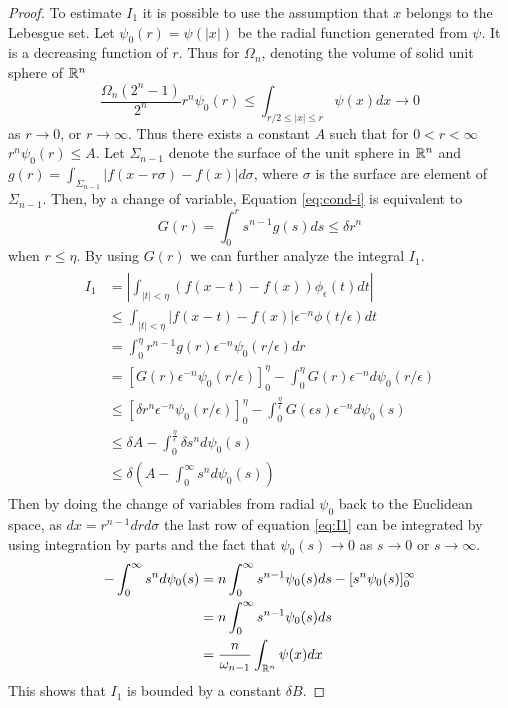 \begin{proof}
    To estimate $I_1$ it is possible to use the assumption that $x$ belongs to the Lebesgue set. Let $\psi_0(r)=\psi(|x|)$ be the radial function generated from $\psi$. It is a decreasing function of $r$. Thus for $\Omega_n$, denoting the volume of solid unit sphere of $\mathbb R^n$
    \begin{equation*}
        \frac{\Omega_n(2^n-1)}{2^n}r^n\psi_0(r)\leq\int_{r/2\leq|x|\leq r} \psi(x)dx\rightarrow0
    \end{equation*}
    as $r\rightarrow 0$, or $r\rightarrow\infty$. Thus there exists a constant $A$ such that for $0<r<\infty$ $r^n\psi_0(r)\leq A$. Let $\Sigma_{n-1}$ denote the surface of the unit sphere in $\mathbb R^n$ and $g(r)=\int_{\Sigma_{n-1}}|f(x-r\sigma)-f(x)|d\sigma$, where $\sigma$ is the surface are element of $\Sigma_{n-1}$. Then, by a change of variable, Equation \ref{eq:cond-i} is equivalent to
    \begin{equation*}
        G(r)=\int_0^rs^{n-1}g(s)ds\leq\delta r^n
    \end{equation*}
    when $r\leq\eta$. By using $G(r)$ we can further analyze the integral $I_1$.
    \begin{align}\label{eq:I1}
        \begin{split}
            I_1&=\left|\int_{|t|<\eta}(f(x-t)-f(x))\phi_\epsilon(t)dt \right| \\
            &\leq\int_{|t|<\eta}|f(x-t)-f(x)|\epsilon^{-n}\phi(t/\epsilon)dt \\
            &=\int_0^\eta r^{n-1}g(r)\epsilon^{-n}\psi_0(r/\epsilon)dr \\
            &=[G(r)\epsilon^{-n}\psi_0(r/\epsilon)]_0^\eta-\int_0^\eta G(r)\epsilon^{-n}d\psi_0(r/\epsilon) \\
            &\leq[\delta r^n\epsilon^{-n}\psi_0(r/\epsilon)]_0^\eta-\int_0^{\frac{\eta}{\epsilon}}G(\epsilon s)\epsilon^{-n}d\psi_0(s) \\
            &\leq\delta A-\int_0^{\frac{\eta}{\epsilon}}\delta s^nd\psi_0(s) \\
            &\leq\delta\left(A-\int_0^\infty s^nd\psi_0(s) \right)
        \end{split}
    \end{align}
    Then by doing the change of variables from radial $\psi_0$ back to the Euclidean space, as $dx=r^{n-1}drd\sigma$ the last row of equation \ref{eq:I1} can be integrated by using integration by parts and the fact that $\psi_0(s)\rightarrow0$ as $s\rightarrow0$ or $s\rightarrow\infty$.
    \begin{align*}
        -\int_0^\infty s^nd\psi_0(s)&=n\int_0^\infty s^{n-1}\psi_0(s) ds-[s^n\psi_0(s)]_0^\infty \\
        &=n\int_0^\infty s^{n-1}\psi_0(s) ds \\
        &=\frac{n}{\omega_{n-1}}\int_{\mathbb R^n}\psi(x)dx
    \end{align*}
    This shows that $I_1$ is bounded by a constant $\delta B$.


\end{proof}
